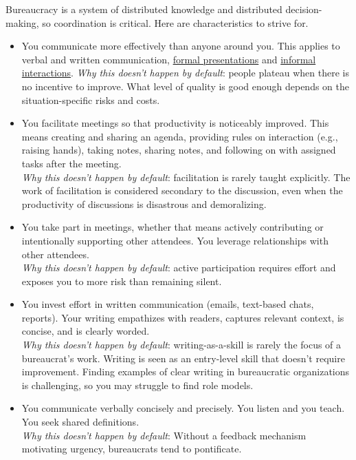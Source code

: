 Bureaucracy is a system of distributed knowledge and distributed decision-making, so coordination is critical. Here are characteristics to strive for. 
\begin{itemize}
    \item You communicate more effectively than anyone around you. This applies to verbal and written communication, \hyperref[sec:effective-presentations]{formal presentations} 
    and \hyperref[sec:walk-arounds]{informal interactions}.
    \textit{Why this doesn't happen by default}: people plateau when there is no incentive to improve. What level of quality is good enough depends on the situation-specific risks and costs.
    \item You facilitate meetings so that productivity is noticeably improved. This means creating and sharing an agenda, providing rules on interaction (e.g., raising hands), taking notes, sharing notes, and following on with assigned tasks after the meeting.\\
    \textit{Why this doesn't happen by default}: facilitation is rarely taught explicitly. The work of facilitation is considered secondary to the discussion, even when the productivity of discussions is disastrous and demoralizing. 
    \item You take part in meetings, whether that means actively contributing or intentionally supporting other attendees. You leverage relationships with other attendees.\\ 
    \textit{Why this doesn't happen by default}: active participation requires effort and exposes you to more risk than remaining silent.
    \item You invest effort in written communication (emails, text-based chats, reports). Your writing empathizes with readers, captures relevant context, is concise, and is clearly worded.\\
    \textit{Why this doesn't happen by default}: writing-as-a-skill is rarely the focus of a bureaucrat's work. Writing is seen as an entry-level skill that doesn't require improvement. Finding examples of clear writing in bureaucratic organizations is challenging, so you may struggle to find role models. 
    \item You communicate verbally concisely and precisely. You listen and you teach. You seek shared definitions. \\
    \textit{Why this doesn't happen by default}: Without a feedback mechanism motivating urgency, bureaucrats tend to pontificate. 

\end{itemize}
